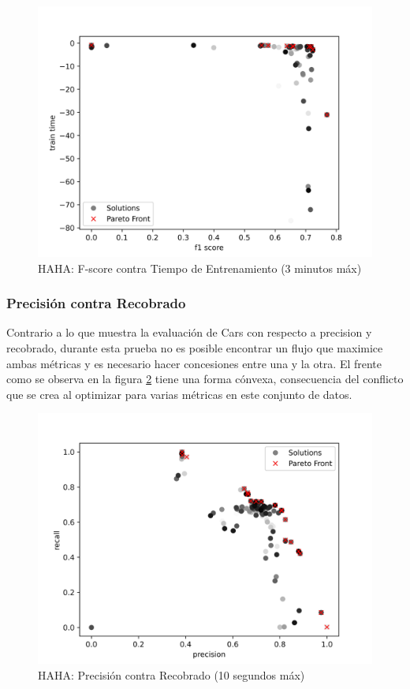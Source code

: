 \begin{figure}[ht]
    \centering
    \includegraphics[scale=0.65]{Pictures/haha_fscore_vs_time_3min.jpg}
    \caption{HAHA: F-score contra Tiempo de Entrenamiento (3 minutos m\'ax)}
    \label{impl:fig:haha:fscore_vs_time_3min}
\end{figure}

\subsubsection{Precisi\'on contra Recobrado}
Contrario a lo que muestra la evaluaci\'on de Cars con respecto a precision y recobrado, durante esta prueba no es posible encontrar un flujo que maximice ambas m\'etricas y es necesario hacer concesiones entre una y la otra. El frente como se observa en la figura \ref{impl:fig:haha:precision_vs_recall} tiene una forma c\'onvexa, consecuencia del conflicto que se crea al optimizar para varias m\'etricas en este conjunto de datos.

\begin{figure}[ht]
    \centering
    \includegraphics[scale=0.65]{Pictures/haha_precision_vs_recall.jpg}
    \caption{HAHA: Precisi\'on contra Recobrado (10 segundos m\'ax)}
    \label{impl:fig:haha:precision_vs_recall}
\end{figure}

